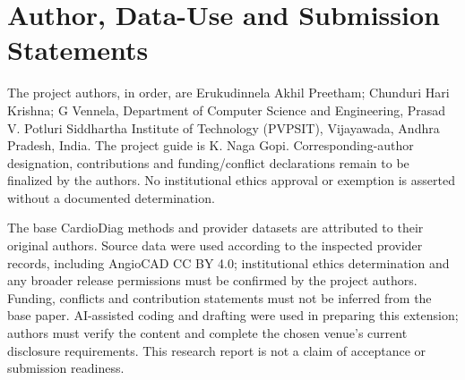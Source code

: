 \documentclass[conference]{IEEEtran}
\begin{document}
\section*{Author, Data-Use and Submission Statements}
The project authors, in order, are Erukudinnela Akhil Preetham; Chunduri Hari Krishna; G Vennela, Department of Computer Science and Engineering, Prasad V. Potluri Siddhartha Institute of Technology (PVPSIT), Vijayawada, Andhra Pradesh, India. The project guide is K. Naga Gopi. Corresponding-author designation, contributions and funding/conflict declarations remain to be finalized by the authors. No institutional ethics approval or exemption is asserted without a documented determination.

The base CardioDiag methods and provider datasets are attributed to their original authors. Source data were used according to the inspected provider records, including AngioCAD CC BY 4.0; institutional ethics determination and any broader release permissions must be confirmed by the project authors. Funding, conflicts and contribution statements must not be inferred from the base paper. AI-assisted coding and drafting were used in preparing this extension; authors must verify the content and complete the chosen venue's current disclosure requirements. This research report is not a claim of acceptance or submission readiness.
\end{document}
